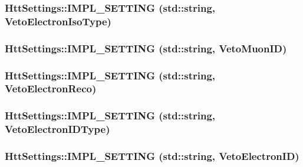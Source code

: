 \label{classHttSettings_a780562e8bdad824022e61ce90585851e}
\hypertarget{classHttSettings_a6dba2be5fe67cc4156a37199ee691e6d}{
\subsubsection[{IMPL\_\-SETTING}]{\setlength{\rightskip}{0pt plus 5cm}HttSettings::IMPL\_\-SETTING (std::string, \/  VetoElectronIsoType)}}
\label{classHttSettings_a6dba2be5fe67cc4156a37199ee691e6d}
\hypertarget{classHttSettings_aeaa16bed1e69ba55ea7918983bf1c0a3}{
\subsubsection[{IMPL\_\-SETTING}]{\setlength{\rightskip}{0pt plus 5cm}HttSettings::IMPL\_\-SETTING (std::string, \/  VetoMuonID)}}
\label{classHttSettings_aeaa16bed1e69ba55ea7918983bf1c0a3}
\hypertarget{classHttSettings_af47c559944526dcba8e6292a83f07ea6}{
\subsubsection[{IMPL\_\-SETTING}]{\setlength{\rightskip}{0pt plus 5cm}HttSettings::IMPL\_\-SETTING (std::string, \/  VetoElectronReco)}}
\label{classHttSettings_af47c559944526dcba8e6292a83f07ea6}
\hypertarget{classHttSettings_a56584f6e7fba4d5ace62dcc2d6ef9536}{
\subsubsection[{IMPL\_\-SETTING}]{\setlength{\rightskip}{0pt plus 5cm}HttSettings::IMPL\_\-SETTING (std::string, \/  VetoElectronIDType)}}
\label{classHttSettings_a56584f6e7fba4d5ace62dcc2d6ef9536}
\hypertarget{classHttSettings_a255e2d32a36f214ad7726e7a3644a49e}{
\subsubsection[{IMPL\_\-SETTING}]{\setlength{\rightskip}{0pt plus 5cm}HttSettings::IMPL\_\-SETTING (std::string, \/  VetoElectronID)}}
